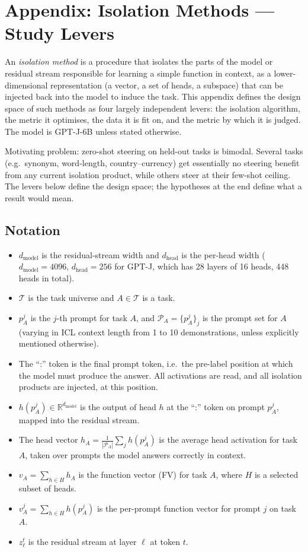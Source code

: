 \documentclass[
]{article}
\author{}
\date{}
\providecommand{\tightlist}{%
  \setlength{\itemsep}{0pt}\setlength{\parskip}{0pt}}
\newcommand{\dmodel}{d_{\mathrm{model}}}
\newcommand{\dhead}{d_{\mathrm{head}}}
\begin{document}
\section{Appendix: Isolation Methods — Study Levers}\label{isolation-methods-study-levers}

An \emph{isolation method} is a procedure that isolates the parts of the model or
residual stream responsible for learning a simple function in context, as a
lower-dimensional representation (a vector, a set of heads, a subspace) that can be
injected back into the model to induce the task. This appendix defines the design
space of such methods as four largely independent levers: the isolation algorithm,
the metric it optimises, the data it is fit on, and the metric by which it is judged.
The model is GPT-J-6B unless stated otherwise.

Motivating problem: zero-shot steering on held-out tasks is bimodal. Several tasks
(e.g.~synonym, word-length, country--currency) get essentially no steering benefit
from any current isolation product, while others steer at their few-shot ceiling. The
levers below define the design space; the hypotheses at the end define what a result
would mean.

\subsection{Notation}\label{notation}

\begin{itemize}
\tightlist
\item
  \(\dmodel\) is the residual-stream width and \(\dhead\) is the per-head width
  (\(\dmodel = 4096\), \(\dhead = 256\) for GPT-J, which has 28 layers of 16 heads,
  448 heads in total).
\item
  \(\mathcal{T}\) is the task universe and \(A \in \mathcal{T}\) is a task.
\item
  \(p_A^j\) is the \(j\)-th prompt for task \(A\), and
  \(\mathcal{P}_A = \{p_A^j\}_j\) is the prompt set for \(A\) (varying in ICL context
  length from 1 to 10 demonstrations, unless explicitly mentioned otherwise).
\item
  The ``:'' token is the final prompt token, i.e.~the pre-label position at which the
  model must produce the answer. All activations are read, and all isolation products
  are injected, at this position.
\item
  \(h(p_A^j) \in \mathbb{R}^{\dmodel}\) is the output of head \(h\) at the ``:''
  token on prompt \(p_A^j\), mapped into the residual stream.
\item
  The head vector \(h_A = \frac{1}{|\mathcal{P}_A|} \sum_j h(p_A^j)\) is the average
  head activation for task \(A\), taken over prompts the model answers correctly
  in context.
\item
  \(v_A = \sum_{h \in H} h_A\) is the function vector (FV) for task \(A\), where
  \(H\) is a selected subset of heads.
\item
  \(v^j_A = \sum_{h \in H} h(p_A^j)\) is the per-prompt function vector for prompt
  \(j\) on task \(A\).
\item
  \(z^t_\ell\) is the residual stream at layer \(\ell\) at token \(t\).
\end{itemize}
\end{document}
